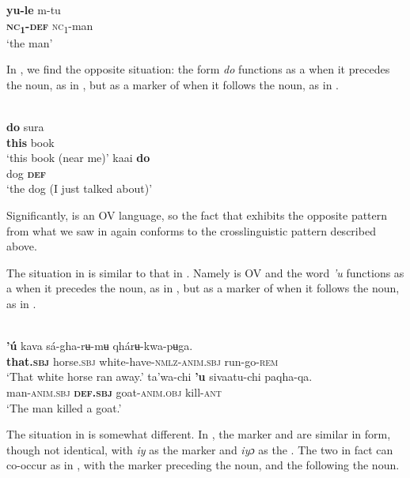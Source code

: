 \documentclass[output=paper]{langsci/langscibook}
\begin{document}
  \ex
  \gll    \textbf{yu-le}  m-tu\\
	  \textbf{\textsc{nc}}\textbf{\textsubscript{1}}\textbf{{}-}\textbf{\textsc{def}}  \textsc{nc}\textsubscript{1}{}-man\\
  \glt     ‘the man’
  \z
\z

In , we find the opposite situation: the form \textit{do} functions as a  when it precedes the noun, as in , but as a marker of  when it follows the noun, as in .

\ea\label{ex:dryer:38}
\\
\ea\label{ex:dryer:38a}
\gll     \textbf{do}  sura  \\  
         \textbf{this}  book\\    
\glt     ‘this book (near me)’  
\ex \label{ex:dryer:38b}
\gll kaai  \textbf{do}\\
    dog  \textbf{\textsc{def}}\\
\glt  ‘the dog (I just talked about)’
\z
\z

\noindent Significantly,  is an OV language, so the fact that  exhibits the opposite pattern from what we saw in  again conforms to the crosslinguistic pattern described above.

The situation in  is similar to that in . Namely  is OV and the word \textit{'u} functions as a  when it precedes the noun, as in , but as a marker of  when it follows the noun, as in .

\ea\label{ex:dryer:39}
\\
\ea\label{ex:dryer:39a}
\gll     \textbf{'ú}  kava  sá-gha-rʉ-mʉ  qhárʉ-kwa-pʉga.\\
         \textbf{that.\textsc{sbj}}  horse.\textsc{sbj}  white-have-\textsc{nmlz-anim.sbj}  run-go-\textsc{rem}\\
\glt     ‘That white horse ran away.’
\ex\label{ex:dryer:39b}
\gll    ta'wa-chi  \textbf{'u}  sivaatu-chi  paqha-qa.\\
         man-\textsc{anim.sbj}  \textbf{\textsc{def.sbj}}  goat-\textsc{anim.obj}  kill-\textsc{ant}\\
\glt     ‘The man killed a goat.’
\z
\z

The situation in  is somewhat different. In , the  marker and  are similar in form, though not identical, with \textit{iy} as the  marker and \textit{iyɔ} as the . The two in fact can co-occur as in , with the  marker preceding the noun, and the  following the noun.
\end{document}
